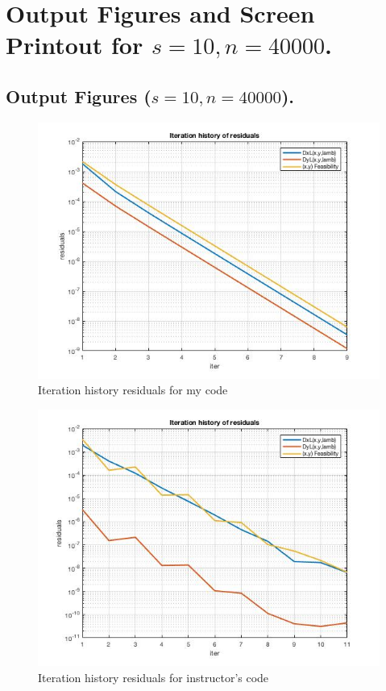 \clearpage
\section{Output Figures and Screen Printout for $s=10,n=40000$.}
\subsection{Output Figures ($s=10,n=40000$).}
\begin{figure}[H]
\centering
\includegraphics[width=12cm]{F_8/F_1_2.jpg}
\caption{Iteration history residuals for my code}
\end{figure}
\begin{figure}[H]
\centering
\includegraphics[width=12cm]{F_8/F_1_3.jpg}
\caption{Iteration history residuals for instructor's code}
\end{figure}

